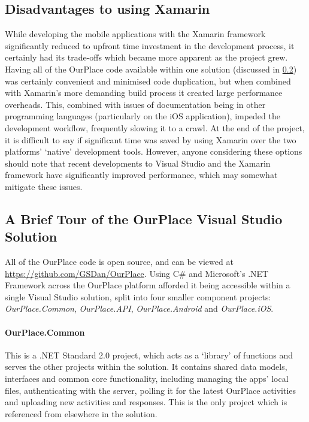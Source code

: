 \subsection{Disadvantages to using Xamarin}
While developing the mobile applications with the Xamarin framework
significantly reduced to upfront time investment in the development process, it
certainly had its trade-offs which became more apparent as the project grew.
Having all of the OurPlace code available within one solution (discussed in
\ref{sec:OurPlaceSolution}) was certainly convenient and minimised code
duplication, but when combined with Xamarin's more demanding build process it
created large performance overheads. This, combined with issues of documentation
being in other programming languages (particularly on the iOS application),
impeded the development workflow, frequently slowing it to a crawl. At the end
of the project, it is difficult to say if significant time was saved by using
Xamarin over the two platforms' `native' development tools. However, anyone
considering these options should note that recent developments to Visual Studio
and the Xamarin framework have significantly improved performance, which may somewhat
mitigate these issues.

\subsection{A Brief Tour of the OurPlace Visual Studio Solution}
\label{sec:OurPlaceSolution}
All of the OurPlace code is open source, and can be viewed at
\url{https://github.com/GSDan/OurPlace}. Using C\# and Microsoft's .NET Framework
across the OurPlace platform afforded it being accessible within a single Visual
Studio solution, split into four smaller component projects:
\textit{OurPlace.Common}, \textit{OurPlace.API}, \textit{OurPlace.Android} and
\textit{OurPlace.iOS}.

\paragraph{OurPlace.Common}
This is a .NET Standard 2.0 project, which acts as a `library' of functions and
serves the other projects within the solution. It contains shared data models,
interfaces and common core functionality, including managing the apps' local
files, authenticating with the server, polling it for the latest OurPlace
activities and uploading new activities and responses. This is the only project
which is referenced from elsewhere in the solution.

